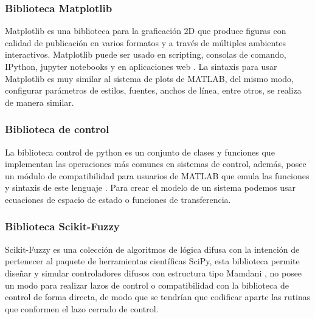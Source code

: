         \subsubsection{Biblioteca Matplotlib}

            Matplotlib es una biblioteca para la graficación 2D que produce figuras con calidad de publicación en varios formatos y a través de múltiples ambientes interactivos. Matplotlib puede ser usado en scripting, consolas de comando, IPython, jupyter notebooks y en aplicaciones web \Parencite{Hunter:2007}. La sintaxis para usar Matplotlib es muy similar al sistema de plots de MATLAB, del mismo modo, configurar parámetros de estilos, fuentes, anchos de línea, entre otros, se realiza de manera similar.

        \subsubsection{Biblioteca de control}

            La biblioteca control de python es un conjunto de clases y funciones que implementan las operaciones más comunes en sistemas de control, además, posee un módulo de compatibilidad para usuarios de MATLAB que emula las funciones y sintaxis de este lenguaje \Parencite{pythoncontrol}. Para crear el modelo de un sistema podemos usar ecuaciones de espacio de estado o funciones de transferencia.

        \subsubsection{Biblioteca Scikit-Fuzzy}
            
            Scikit-Fuzzy es una colección de algoritmos de lógica difusa con la intención de pertenecer al paquete de herramientas científicas SciPy, esta biblioteca permite diseñar y simular controladores difusos con estructura tipo Mamdani \Parencite{warner2016fuzzy}, no posee un modo para realizar lazos de control o compatibilidad con la biblioteca de control de forma directa, de modo que se tendrían que codificar aparte las rutinas que conformen el lazo cerrado de control.